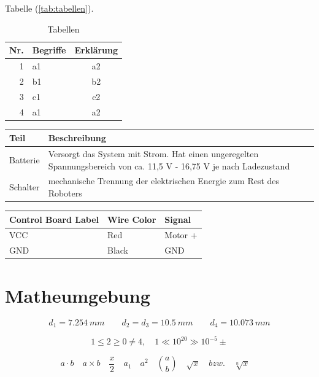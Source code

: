  Tabelle (\autoref{tab:tabellen}). 
\begin{table}[!h]%
	\centering 
    \caption{Tabellen}\label{tab:tabellen}%
	\begin{tabular}{@{}rlc@{}}
	\toprule 
    \textbf{Nr.} & \textbf{Begriffe} & \textbf{Erklärung}\\
	\midrule
    1 & a1 & a2\\
    2 & b1 & b2\\
    3 & c1 & c2\\
    4 & a1 & a2\\
	\bottomrule
 	\end{tabular}
\end{table}


\noindent
\begin{tabular}[2]{|p{3cm}|p{9cm}|}
	\hline
	\textbf{Teil} & \textbf{Beschreibung} \\ \hline
	Batterie & Versorgt das System mit Strom. Hat einen ungeregelten Spannungsbereich von ca. 11,5 V - 16,75 V je nach Ladezustand \\ \hline
	Schalter & mechanische Trennung der elektrischen Energie zum Rest des Roboters \\ \hline
\end{tabular}
\bigskip

\noindent
\begin{tabular}[3] {| l | l | l |}
	\hline
	\textbf{Control Board Label} & \textbf{Wire Color} & \textbf{Signal} \\ \hline
	VCC & Red & Motor + \\ \hline
	GND & Black & GND \\ \hline
\end{tabular} 


\section{Matheumgebung}\label{sec:matheumgebung}

\begin{equation}\label{eq:mass}%
	d_1 = 7.254~mm \qquad d_2 = d_3 = 10.5~mm \qquad d_4 = 10.073~mm
\end{equation}

\begin{equation}\label{eq:kleiner}%
	1 \le 2 \ge 0 \neq 4, \quad 1 \ll 10^{20} \gg 10^{-5} \pm 
\end{equation}

\begin{equation}\label{eq:produkt}%
	a \cdot b \quad
	a \times b \quad
	\frac x2 \quad
	a_1 \quad
	a^2 \quad
	\binom{a}{b} \quad
	\sqrt{x} \quad bzw. \quad \sqrt[n]{x} \quad	
\end{equation}


